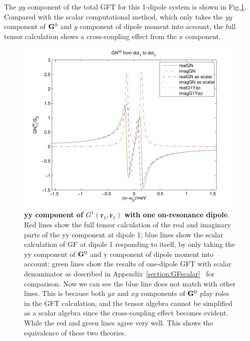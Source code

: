 The $yy$ component of the total GFT for this 1-dipole system is shown in Fig.\ref{G84_1yy_2}. Compared with the scalar computational method, which only takes the $yy$ component of $\mathbf{G}^0$ and $y$ component of dipole moment into account, the full tensor calculation shows a cross-coupling effect from the $x$ component.
\begin{figure}[H]
\centering
\begin{center}
\includegraphics[width=14cm]{./Figs/G84_1yy_2}
\end{center}
\caption[yy component of $G^1(\mathbf{r}_1,\mathbf{r}_1)$  with one on-resonance dipole.]{\textbf{  yy component of $G^1(\mathbf{r}_1,\mathbf{r}_1)$  with one on-resonance dipole}. Red lines show the full tensor calculation of the real and imaginary parts of the yy component at dipole 1; blue lines show the scalar calculation of GF at dipole 1 responding to itself, by only taking the yy component of $\mathbf{G}^0$ and y component of dipole moment into account; green lines show the results of one-dipole GFT with scalar denominator as described in Appendix~\ref{section:GFscalar}~\cite{Yao2009b} for comparison. Now we can see the blue line does not match with other lines. This is because both $yx$ and $xy$ components of $\mathbf{G}^0$ play roles in the GFT calculation, and the tensor algebra cannot be simplified as a scalar algebra since the cross-coupling effect becomes evident. While the red and green lines agree very well. This shows the equivalence of these two theories.}
\label{G84_1yy_2}
\end{figure}

